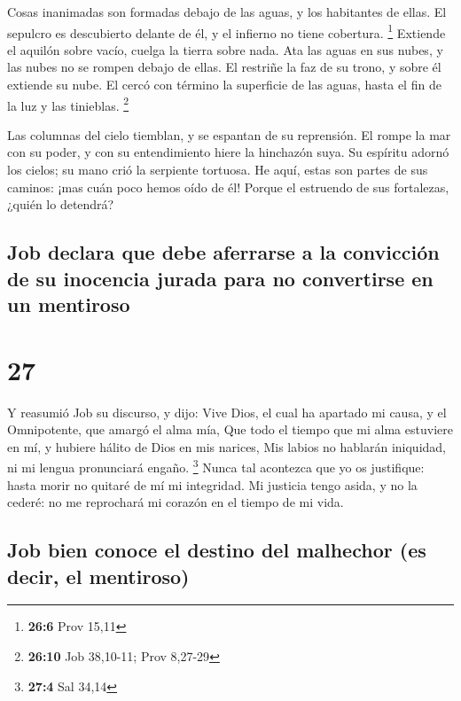  Cosas inanimadas son formadas debajo de las aguas, y los
habitantes de ellas.  El sepulcro es descubierto delante de
él, y el infierno no tiene cobertura. \footnote{\textbf{26:6} Prov 15,11}
 Extiende el aquilón sobre vacío, cuelga la tierra sobre
nada.  Ata las aguas en sus nubes, y las nubes no se rompen
debajo de ellas.  El restriñe la faz de su trono, y sobre él
extiende su nube.  El cercó con término la superficie de
las aguas, hasta el fin de la luz y las tinieblas. \footnote{\textbf{26:10}
  Job 38,10-11; Prov 8,27-29}

 Las columnas del cielo tiemblan, y se espantan de su
reprensión.  El rompe la mar con su poder, y con su
entendimiento hiere la hinchazón suya.  Su espíritu adornó
los cielos; su mano crió la serpiente tortuosa.  He aquí,
estas son partes de sus caminos: ¡mas cuán poco hemos oído de él! Porque
el estruendo de sus fortalezas, ¿quién lo detendrá?

\hypertarget{job-declara-que-debe-aferrarse-a-la-convicciuxf3n-de-su-inocencia-jurada-para-no-convertirse-en-un-mentiroso}{%
\subsection{Job declara que debe aferrarse a la convicción de su
inocencia jurada para no convertirse en un
mentiroso}\label{job-declara-que-debe-aferrarse-a-la-convicciuxf3n-de-su-inocencia-jurada-para-no-convertirse-en-un-mentiroso}}

\hypertarget{section-26}{%
\section{27}\label{section-26}}

 Y reasumió Job su discurso, y dijo:  Vive Dios,
el cual ha apartado mi causa, y el Omnipotente, que amargó el alma mía,
 Que todo el tiempo que mi alma estuviere en mí, y hubiere
hálito de Dios en mis narices,  Mis labios no hablarán
iniquidad, ni mi lengua pronunciará engaño. \footnote{\textbf{27:4} Sal
  34,14}  Nunca tal acontezca que yo os justifique: hasta
morir no quitaré de mí mi integridad.  Mi justicia tengo
asida, y no la cederé: no me reprochará mi corazón en el tiempo de mi
vida.

\hypertarget{job-bien-conoce-el-destino-del-malhechor-es-decir-el-mentiroso}{%
\subsection{Job bien conoce el destino del malhechor (es decir, el
mentiroso)}\label{job-bien-conoce-el-destino-del-malhechor-es-decir-el-mentiroso}}

